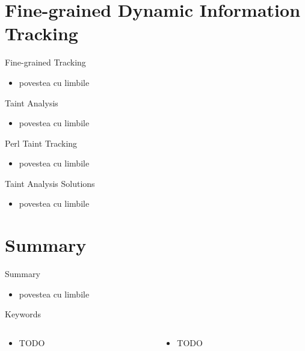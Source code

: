 \documentclass{curs}
\begin{document}
\section{Fine-grained Dynamic Information Tracking}

\begin{frame}{Fine-grained Tracking}
  \begin{itemize}
    \item povestea cu limbile
  \end{itemize}
\end{frame}

\begin{frame}{Taint Analysis}
  \begin{itemize}
    \item povestea cu limbile
  \end{itemize}
\end{frame}

\begin{frame}{Perl Taint Tracking}
  \begin{itemize}
    \item povestea cu limbile
  \end{itemize}
\end{frame}

\begin{frame}{Taint Analysis Solutions}
  \begin{itemize}
    \item povestea cu limbile
  \end{itemize}
\end{frame}

\section{Summary}

\begin{frame}{Summary}
  \begin{itemize}
    \item povestea cu limbile
  \end{itemize}
\end{frame}

\begin{frame}{Keywords}
  \begin{columns}
    \begin{column}{0.5\textwidth}
      \begin{itemize}
        \item TODO
      \end{itemize}
    \end{column}
    \begin{column}{0.5\textwidth}
      \begin{itemize}
        \item TODO
      \end{itemize}
    \end{column}
  \end{columns}
\end{frame}
\end{document}
